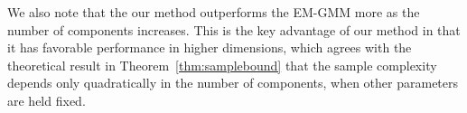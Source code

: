 \documentclass{article}
\begin{document}
We also note that the our method outperforms the EM-GMM more as the number of components increases.
This is the key advantage of our method in that it has favorable performance in higher dimensions, which agrees with the theoretical result in Theorem~\ref{thm:samplebound} that the sample complexity depends only quadratically in the number of components, when other parameters are held fixed.

\end{document}
